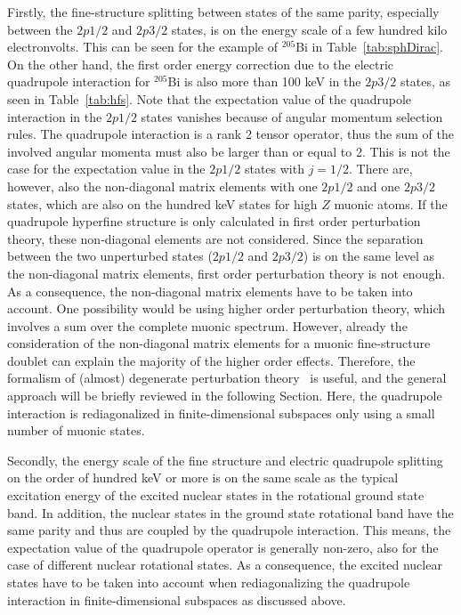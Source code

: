 Firstly, the fine-structure splitting between states of the same parity, especially between the $2p1/2$ and $2p3/2$ states, is on the energy scale of a few hundred kilo electronvolts. This can be seen for the example of $^{205}$Bi in Table~\ref{tab:sphDirac}. On the other hand, the first order energy correction due to the electric quadrupole interaction for $^{205}$Bi is also more than 100 keV in the $2p3/2$ states, as seen in Table~\ref{tab:hfs}. Note that the expectation value of the quadrupole interaction in the $2p1/2$ states vanishes because of angular momentum selection rules. The quadrupole interaction is a rank 2 tensor operator, thus the sum of the involved angular momenta must also be larger than or equal to 2. This is not the case for the expectation value in the $2p1/2$ states with $j=1/2$. There are, however, also the non-diagonal matrix elements with one $2p1/2$ and one $2p3/2$ states, which are also on the hundred keV states for high $Z$ muonic atoms. If the quadrupole hyperfine structure is only calculated in first order perturbation theory, these non-diagonal elements are not considered. Since the separation between the two unperturbed states ($2p1/2$ and $2p3/2$) is on the same level as the non-diagonal matrix elements, first order perturbation theory is not enough. As a consequence, the non-diagonal matrix elements have to be taken into account. One possibility would be using higher order perturbation theory, which involves a sum over the complete muonic spectrum. However, already the consideration of the non-diagonal matrix elements for a muonic fine-structure doublet can explain the majority of the higher order effects. Therefore, the formalism of (almost) degenerate perturbation theory~\cite{sakurai1994} is useful, and the general approach will be briefly reviewed in the following Section. Here, the quadrupole interaction is rediagonalized in finite-dimensional subspaces only using a small number of muonic states.

Secondly, the energy scale of the fine structure and electric quadrupole splitting on the order of hundred keV or more is on the same scale as the typical excitation energy of the excited nuclear states in the rotational ground state band. In addition, the nuclear states in the ground state rotational band have the same parity and thus are coupled by the quadrupole interaction. This means, the expectation value of the quadrupole operator is generally non-zero, also for the case of different nuclear rotational states. As a consequence, the excited nuclear states have to be taken into account when rediagonalizing the quadrupole interaction in finite-dimensional subspaces as discussed above.

